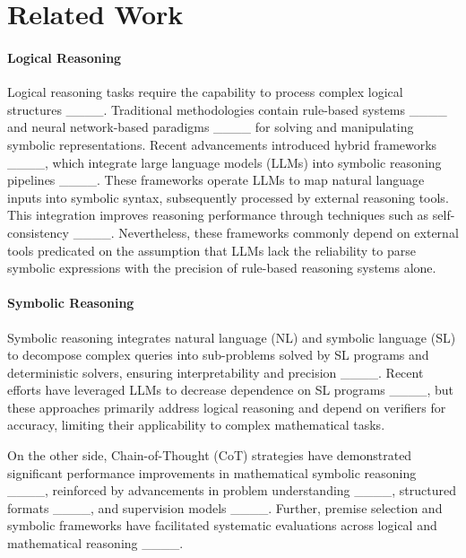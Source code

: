 \section{Related Work}
\paragraph{Logical Reasoning} Logical reasoning tasks require the capability to process complex logical structures ____. Traditional methodologies contain rule-based systems ____ and neural network-based paradigms ____ for solving and manipulating symbolic representations. Recent advancements introduced hybrid frameworks ____, which integrate large language models (LLMs) into symbolic reasoning pipelines ____. These frameworks operate LLMs to map natural language inputs into symbolic syntax, subsequently processed by external reasoning tools. This integration improves reasoning performance through techniques such as self-consistency ____. Nevertheless, these frameworks commonly depend on external tools predicated on the assumption that LLMs lack the reliability to parse symbolic expressions with the precision of rule-based reasoning systems alone.

\paragraph{Symbolic Reasoning}
Symbolic reasoning integrates natural language (NL) and symbolic language (SL) to decompose complex queries into sub-problems solved by SL programs and deterministic solvers, ensuring interpretability and precision ____. Recent efforts have leveraged LLMs to decrease dependence on SL programs ____, but these approaches primarily address logical reasoning and depend on verifiers for accuracy, limiting their applicability to complex mathematical tasks.

On the other side, Chain-of-Thought (CoT) strategies have demonstrated significant performance improvements in mathematical symbolic reasoning ____, reinforced by advancements in problem understanding ____, structured formats ____, and supervision models ____. Further, premise selection and symbolic frameworks have facilitated systematic evaluations across logical and mathematical reasoning ____.